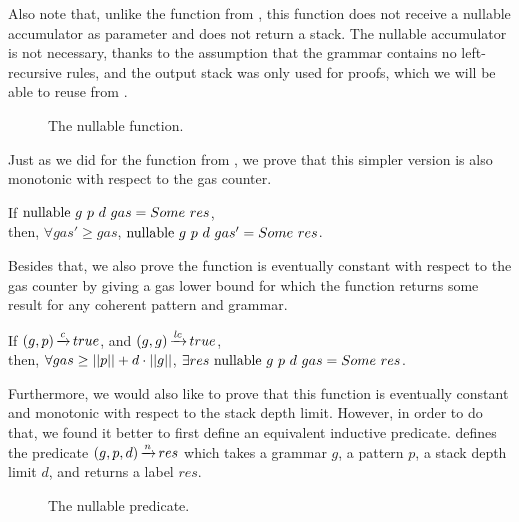 Also note that, unlike the function from ,
this function does not receive a nullable accumulator as parameter
and does not return a stack.
The nullable accumulator is not necessary,
thanks to the assumption that
the grammar contains no left-recursive rules,
and the output stack was only used for proofs,
which we will be able to reuse from .

\begin{figure}
    \centering
    
    \caption{The nullable function.}
    \label{fig:nullable-function}
\end{figure}

Just as we did for the function from ,
we prove that this simpler version is also
monotonic
with respect to the gas counter.

\begin{lemma}%
    If $\text{nullable}\ g\ p\ d\ gas = Some\ res$, \\
    then, $\forall gas' \ge gas$,
    $\text{nullable}\ g\ p\ d\ gas' = Some\ res$.
    \label{lemma:nullable-gas-monotonicity}
\end{lemma}

Besides that, we also prove the function
is eventually constant with respect to the gas counter
by giving a gas lower bound for which the function
returns some result for any coherent pattern and grammar.

\begin{lemma}%
    If $(g,p) \operatorname{\xrightarrow{\mathit{c}}} true$,
    and $(g,g) \operatorname{\xrightarrow{\mathit{lc}}} true$, \\
    then, $\forall gas \ge ||p|| + d \cdot ||g||$,
    $\exists res\ \nullablecomp{g}{p}{d}{gas} = \Some res$.
    \label{lemma:nullable-termination}
\end{lemma}

Furthermore, we would also like to prove that
this function is eventually constant and monotonic
with respect to the stack depth limit.
However, in order to do that,
we found it better to first define an equivalent inductive predicate.
 defines the predicate
$(g,p,d) \operatorname{\xrightarrow{\mathit{n}}} res$ which takes a grammar $g$,
a pattern $p$, a stack depth limit $d$, and returns a label $res$.

\begin{figure}
    \centering
    
    \caption{The nullable predicate.}
    \label{fig:nullable-predicate}
\end{figure}

